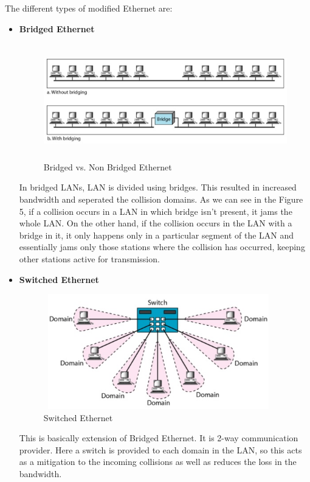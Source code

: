 \documentclass[12pt]{article}
\begin{document}
The different types of modified Ethernet are:
\begin{itemize}
    \item \textbf{Bridged Ethernet} \\
        \begin{figure}
            \centering
            \includegraphics[width=15cm, height=5cm]{bridged_ethernet.png}
            \caption{Bridged vs. Non Bridged Ethernet}
        \end{figure}
        In bridged LANs, LAN is divided using bridges. This resulted in increased bandwidth and seperated the collision domains. As we can see in the Figure 5, if a collision occurs in a LAN in which bridge isn't present, it jams the whole LAN. On the other hand, if the collision occurs in the LAN with a bridge in it, it only happens only in a particular segment of the LAN and essentially jams only those stations where the collision has occurred, keeping other stations active for transmission.
    \item \textbf{Switched Ethernet} \\
        \begin{figure}
            \centering
            \includegraphics[width=10cm, height=5cm]{switched_ethernet.png}
            \caption{Switched Ethernet}
        \end{figure}
        This is basically extension of Bridged Ethernet. It is 2-way communication provider. Here a switch is provided to each domain in the LAN, so this acts as a mitigation to the incoming collisions as well as reduces the loss in the bandwidth.

\end{itemize}
\end{document}
